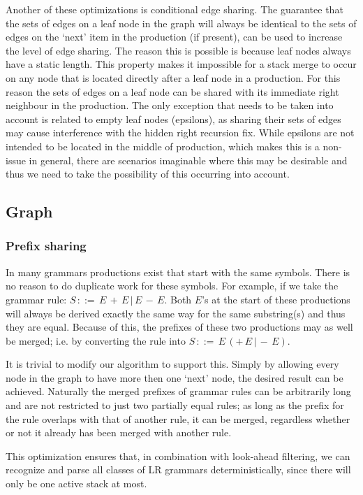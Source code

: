 \documentclass[a4paper,10pt]{article}
\begin{document}
Another of these optimizations is conditional edge sharing. The guarantee that the sets of edges on a leaf node in the graph will always be identical to the sets of edges on the `next' item in the production (if present), can be used to increase the level of edge sharing. The reason this is possible is because leaf nodes always have a static length. This property makes it impossible for a stack merge to occur on any node that is located directly after a leaf node in a production. For this reason the sets of edges on a leaf node can be shared with its immediate right neighbour in the production. The only exception that needs to be taken into account is related to empty leaf nodes (epsilons), as sharing their sets of edges may cause interference with the hidden right recursion fix. While epsilons are not intended to be located in the middle of production, which makes this is a non-issue in general, there are scenarios imaginable where this may be desirable and thus we need to take the possibility of this occurring into account.

\subsection{Graph}

\subsubsection{Prefix sharing}
\label{sec:prefixSharing}
In many grammars productions exist that start with the same symbols. There is no reason to do duplicate work for these symbols. For example, if we take the grammar rule: $S\,::=\,E\,+\,E\,|\,E\,-\,E$. Both $E$'s at the start of these productions will always be derived exactly the same way for the same substring(s) and thus they are equal. Because of this, the prefixes of these two productions may as well be merged; i.e. by converting the rule into $S\,::=\,E\,(+\,E\,|\,-\,E)$.

It is trivial to modify our algorithm to support this. Simply by allowing every node in the graph to have more then one `next' node, the desired result can be achieved. Naturally the merged prefixes of grammar rules can be arbitrarily long and are not restricted to just two partially equal rules; as long as the prefix for the rule overlaps with that of another rule, it can be merged, regardless whether or not it already has been merged with another rule.

This optimization ensures that, in combination with look-ahead filtering, we can recognize and parse all classes of LR grammars deterministically, since there will only be one active stack at most.
\end{document}
